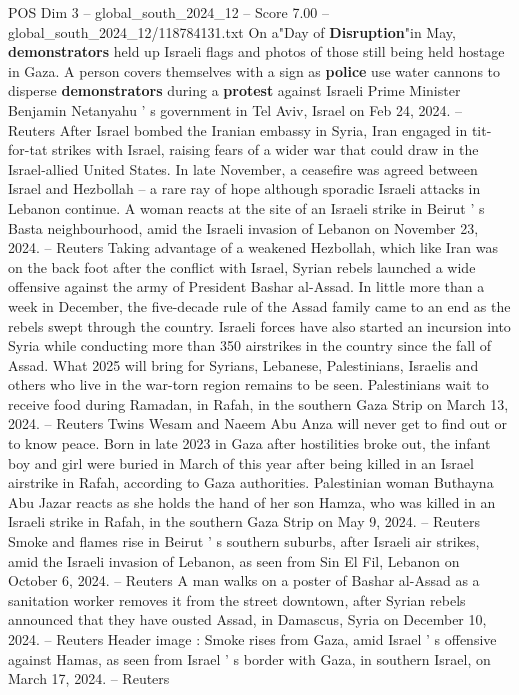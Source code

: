 \begin{textsample}{POS Dim 3 – global\_south\_2024\_12 – Score 7.00 – global\_south\_2024\_12/118784131.txt}
On a"Day of \textbf{Disruption}"in May, \textbf{demonstrators} held up Israeli flags and photos of those still being held hostage in Gaza.
A person covers themselves with a sign as \textbf{police} use water cannons to disperse \textbf{demonstrators} during a \textbf{protest} against Israeli Prime Minister Benjamin Netanyahu ' s government in Tel Aviv, Israel on Feb 24, 2024. -- Reuters After Israel bombed the Iranian embassy in Syria, Iran engaged in tit-for-tat strikes with Israel, raising fears of a wider war that could draw in the Israel-allied United States.
In late November, a ceasefire was agreed between Israel and Hezbollah -- a rare ray of hope although sporadic Israeli attacks in Lebanon continue.
A woman reacts at the site of an Israeli strike in Beirut ' s Basta neighbourhood, amid the Israeli invasion of Lebanon on November 23, 2024. -- Reuters Taking advantage of a weakened Hezbollah, which like Iran was on the back foot after the conflict with Israel, Syrian rebels launched a wide offensive against the army of President Bashar al-Assad.
In little more than a week in December, the five-decade rule of the Assad family came to an end as the rebels swept through the country.
Israeli forces have also started an incursion into Syria while conducting more than 350 airstrikes in the country since the fall of Assad.
What 2025 will bring for Syrians, Lebanese, Palestinians, Israelis and others who live in the war-torn region remains to be seen.
Palestinians wait to receive food during Ramadan, in Rafah, in the southern Gaza Strip on March 13, 2024. -- Reuters Twins Wesam and Naeem Abu Anza will never get to find out or to know peace.
Born in late 2023 in Gaza after hostilities broke out, the infant boy and girl were buried in March of this year after being killed in an Israel airstrike in Rafah, according to Gaza authorities.
Palestinian woman Buthayna Abu Jazar reacts as she holds the hand of her son Hamza, who was killed in an Israeli strike in Rafah, in the southern Gaza Strip on May 9, 2024. -- Reuters Smoke and flames rise in Beirut ' s southern suburbs, after Israeli air strikes, amid the Israeli invasion of Lebanon, as seen from Sin El Fil, Lebanon on October 6, 2024. -- Reuters A man walks on a poster of Bashar al-Assad as a sanitation worker removes it from the street downtown, after Syrian rebels announced that they have ousted Assad, in Damascus, Syria on December 10, 2024. -- Reuters Header image : Smoke rises from Gaza, amid Israel ' s offensive against Hamas, as seen from Israel ' s border with Gaza, in southern Israel, on March 17, 2024. -- Reuters

\end{textsample}
